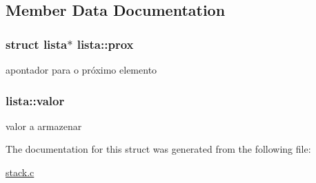 \subsection{Member Data Documentation}
\hypertarget{structlista_a3b0e375147c1163d74544fd206a1f1de}{
\subsubsection[{prox}]{\setlength{\rightskip}{0pt plus 5cm}struct {\bf lista}$\ast$ lista\+::prox}}\label{structlista_a3b0e375147c1163d74544fd206a1f1de}
apontador para o próximo elemento \hypertarget{structlista_a852a031ffa1734cf1750f54248f70bba}{
\subsubsection[{valor}]{ lista\+::valor}}\label{structlista_a852a031ffa1734cf1750f54248f70bba}
valor a armazenar 

The documentation for this struct was generated from the following file\+:\begin{DoxyCompactItemize}
\item 
\hyperlink{stack_8c}{stack.\+c}\end{DoxyCompactItemize}
